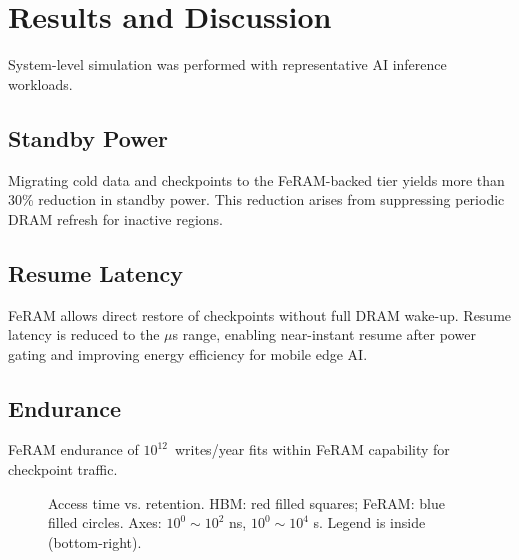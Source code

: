\section{Results and Discussion}
System-level simulation was performed with representative AI inference workloads.

\subsection{Standby Power}
Migrating cold data and checkpoints to the FeRAM-backed tier yields more than 30\% reduction in standby power.
This reduction arises from suppressing periodic DRAM refresh for inactive regions.

\subsection{Resume Latency}
FeRAM allows direct restore of checkpoints without full DRAM wake-up.
Resume latency is reduced to the $\mu$s range, enabling near-instant resume after power gating and improving energy efficiency for mobile edge AI.

\subsection{Endurance}
FeRAM endurance of $10^{12}$~writes/year fits within FeRAM capability for checkpoint traffic.

\begin{figure*}[t]
\centering
{}
\caption{Access time vs. retention. HBM: red filled squares; FeRAM: blue filled circles.
Axes: $10^0\!\sim\!10^2$ ns, $10^0\!\sim\!10^4$ s. Legend is inside (bottom-right).}
\label{fig:retention}
\end{figure*}

